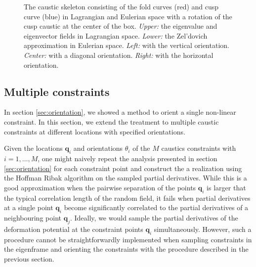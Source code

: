 \documentclass[a4paper, 11pt]{article}
\begin{document}
\begin{figure}
\begin{subfigure}[b]{0.4\textwidth}
\end{subfigure}
\caption{The caustic skeleton consisting of the fold curves (red) and cusp curve (blue) in Lagrangian and Eulerian space with a rotation of the cusp caustic at the center of the box. \textit{Upper:} the eigenvalue and eigenvector fields in Lagrangian space. \textit{Lower:} the Zel'dovich approximation in Eulerian space. \textit{Left:} with the vertical orientation. \textit{Center:} with a diagonal orientation. \textit{Right:} with the horizontal orientation.}\label{fig:rotation}
\end{figure}


\subsection{Multiple constraints}
In section \ref{sec:orientation}, we showed a method to orient a single non-linear constraint. In this section, we extend the treatment to multiple caustic constraints at different locations with specified orientations. 

Given the locations $\bm{q}_i$ and orientations $\theta_i$ of the $M$ caustics constraints with $i=1,\dots,M$, one might naively repeat the analysis presented in section \ref{sec:orientation} for each constraint point and construct the a realization using the Hoffman Ribak algorithm on the sampled partial derivatives. While this is a good approximation when the pairwise separation of the points $\bm{q}_i$ is larger that the typical correlation length of the random field, it fails when partial derivatives at a single point $\bm{q}_i$ become significantly correlated to the partial derivatives of a neighbouring point $\bm{q}_j$. Ideally, we would sample the partial derivatives of the deformation potential at the constraint points $\bm{q}_i$ simultaneously. However, such a procedure cannot be straightforwardly implemented when sampling constraints in the eigenframe and orienting the constraints with the procedure described in the previous section.
\end{document}
